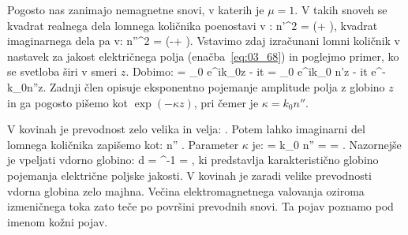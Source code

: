 \label{eq:03_79}
\eeq
Pogosto nas zanimajo nemagnetne snovi, v katerih je $\mu=1$. V takih
snoveh se kvadrat realnega dela lomnega količnika poenostavi v :
\beq
n'^2 = \left(\varepsilon + \right)\!\!,
\label{eq:03_80}
\eeq
kvadrat imaginarnega dela pa v:
\beq
n''^2 = \left(-\varepsilon + \right)\!\!.
\label{eq:03_81}
\eeq
Vstavimo zdaj izračunani lomni količnik v nastavek za jakost električnega polja 
(enačba~\ref{eq:03_68}) in poglejmo
primer, ko se svetloba širi v smeri $z$. Dobimo:
\beq
{} = _0 e^{ik_0z - i\omega t} = 
_0 e^{ik_0 n'z - i\omega t} \cdot e^{-k_0n''z}.
\label{eq:03_82}
\eeq
Zadnji člen opisuje eksponentno pojemanje amplitude polja z globino $z$ in ga pogosto
pišemo kot $\exp(-\kappa z)$, pri čemer je $\kappa = k_0 n''$.

V kovinah je prevodnost zelo velika in velja:
\beq
{} \gg \varepsilon.
\label{eq:03_83}
\eeq
Potem lahko imaginarni del lomnega količnika zapišemo kot:
\beq
n'' \approx {}.
\label{eq:03_84}
\eeq
Parameter $\kappa$ je:
\beq
\kappa = k_0 n'' =   = .
\label{eq:03_85}
\eeq
Nazornejše je vpeljati vdorno globino:
\beq
d = \kappa^{-1} = ,
\label{eq:03_86}
\eeq
ki predstavlja karakteristično globino pojemanja električne poljske jakosti.
V kovinah je zaradi velike prevodnosti vdorna globina zelo majhna. Večina elektromagnetnega
valovanja oziroma izmeničnega toka zato teče po površini prevodnih snovi. Ta pojav poznamo pod imenom
kožni pojav.

